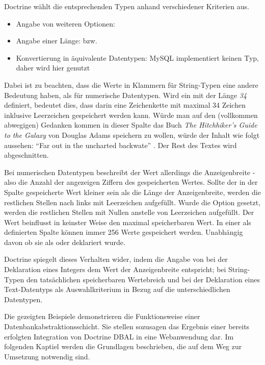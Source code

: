 Doctrine wählt die entsprechenden Typen anhand verschiedener Kriterien aus.

\begin{itemize}
	\item Angabe von weiteren Optionen: 
	\item Angabe einer Länge:  bzw. 
	\item Konvertierung in äquivalente Datentypen: MySQL implementiert keinen  Typ, daher wird hier  genutzt
\end{itemize}

Dabei ist zu beachten, dass die Werte in Klammern für String-Typen eine andere Bedeutung haben, als für numerische Datentypen. Wird ein  mit der Länge \textit{34} definiert, bedeutet dies, dass darin eine Zeichenkette mit maximal 34 Zeichen inklusive Leerzeichen gespeichert werden kann. Würde man auf den (vollkommen abwegigen) Gedanken kommen in dieser Spalte das Buch \textit{The Hitchhiker's Guide to the Galaxy} von Douglas Adams speichern zu wollen, würde der Inhalt wie folgt aussehen: ``Far out in the uncharted backwate'' \cite[S. 3]{book:adamsHitchhikers1995}. Der Rest des Textes wird abgeschnitten.

Bei numerischen Datentypen beschreibt der Wert allerdings die Anzeigenbreite - also die Anzahl der angezeigen Ziffern des gespeicherten Wertes. Sollte der in der Spalte gespeicherte Wert kleiner sein als die Länge der Anzeigenbreite, werden die restlichen Stellen nach links mit Leerzeichen aufgefüllt. Wurde die Option  gesetzt, werden die restlichen Stellen mit Nullen anstelle von Leerzeichen aufgefüllt. Der Wert beinflusst in keinster Weise den maximal speicherbaren Wert. In einer als  definierten Spalte können immer 256 Werte gespeichert werden. Unabhängig davon ob sie als  oder  deklariert wurde.

Doctrine spiegelt dieses Verhalten wider, indem die Angabe von  bei der Deklaration eines Integers dem Wert der Anzeigenbreite entspricht; bei String-Typen den tatsächlichen speicherbaren Wertebreich und bei der Deklaration eines Text-Datentyps als Auswahlkriterium in Bezug auf die unterschiedlichen  Datentypen.

Die gezeigten Beispiele demonstrieren die Funktionsweise einer Datenbankabstraktionsschicht. Sie stellen sozusagen das Ergebnis einer bereits erfolgten Integration von Doctrine DBAL in eine Webanwendung dar. Im folgenden Kaptiel werden die Grundlagen beschrieben, die auf dem Weg zur Umsetzung notwendig sind.
